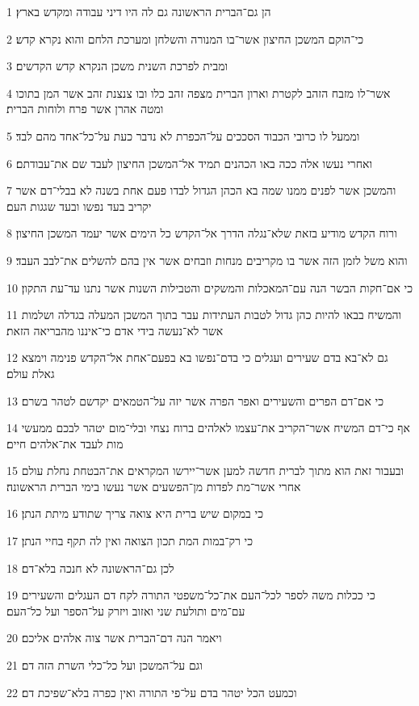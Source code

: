 \par 1 הן גם־הברית הראשונה גם לה היו דיני עבודה ומקדש בארץ׃
\par 2 כי־הוקם המשכן החיצון אשר־בו המנורה והשלחן ומערכת הלחם והוא נקרא קדש׃
\par 3 ומבית לפרכת השנית משכן הנקרא קדש הקדשים׃
\par 4 אשר־לו מזבח הזהב לקטרת וארון הברית מצפה זהב כלו ובו צנצנת זהב אשר המן בתוכו ומטה אהרן אשר פרח ולוחות הברית׃
\par 5 וממעל לו כרובי הכבוד הסככים על־הכפרת לא נדבר כעת על־כל־אחד מהם לבד׃
\par 6 ואחרי נעשו אלה ככה באו הכהנים תמיד אל־המשכן החיצון לעבד שם את־עבודתם׃
\par 7 והמשכן אשר לפנים ממנו שמה בא הכהן הגדול לבדו פעם אחת בשנה לא בבלי־דם אשר יקריב בעד נפשו ובעד שגגות העם׃
\par 8 ורוח הקדש מודיע בזאת שלא־נגלה הדרך אל־הקדש כל הימים אשר יעמד המשכן החיצון׃
\par 9 והוא משל לזמן הזה אשר בו מקריבים מנחות וזבחים אשר אין בהם להשלים את־לבב העבד׃
\par 10 כי אם־חקות הבשר הנה עם־המאכלות והמשקים והטבילות השנות אשר נתנו עד־עת התקון׃
\par 11 והמשיח בבאו להיות כהן גדול לטבות העתידות עבר בתוך המשכן המעלה בגדלה ושלמות אשר לא־נעשה בידי אדם כי־איננו מהבריאה הזאת׃
\par 12 גם לא־בא בדם שעירים ועגלים כי בדם־נפשו בא בפעם־אחת אל־הקדש פנימה וימצא גאלת עולם׃
\par 13 כי אם־דם הפרים והשעירים ואפר הפרה אשר יזה על־הטמאים יקדשם לטהר בשרם׃
\par 14 אף כי־דם המשיח אשר־הקריב את־עצמו לאלהים ברוח נצחי ובלי־מום יטהר לבכם ממעשי מות לעבד את־אלהים חיים׃
\par 15 ובעבור זאת הוא מתוך לברית חדשה למען אשר־יירשו המקראים את־הבטחת נחלת עולם אחרי אשר־מת לפדות מן־הפשעים אשר נעשו בימי הברית הראשונה׃
\par 16 כי במקום שיש ברית היא צואה צריך שתודע מיתת הנתן׃
\par 17 כי רק־במות המת תכון הצואה ואין לה תקף בחיי הנתן׃
\par 18 לכן גם־הראשונה לא חנכה בלא־דם׃
\par 19 כי ככלות משה לספר לכל־העם את־כל־משפטי התורה לקח דם העגלים והשעירים עם־מים ותולעת שני ואזוב ויזרק על־הספר ועל כל־העם׃
\par 20 ויאמר הנה דם־הברית אשר צוה אלהים אליכם׃
\par 21 וגם על־המשכן ועל כל־כלי השרת הזה דם׃
\par 22 וכמעט הכל יטהר בדם על־פי התורה ואין כפרה בלא־שפיכת דם׃
